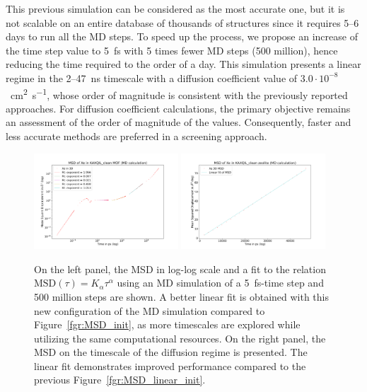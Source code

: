 \documentclass[main]{subfiles}
\begin{document}
This previous simulation can be considered as the most accurate one, but it is not scalable on an entire database of thousands of structures since it requires 5--6 days to run all the MD steps. To speed up the process, we propose an increase of the time step value to 5~\si{\fs} with 5 times fewer MD steps (500 million), hence reducing the time required to the order of a day. This simulation presents a linear regime in the {2}--{47}~\si{\ns} timescale with a diffusion coefficient value of $3.0\cdot10^{-8}$~\si{\square\cm\per\s}, whose order of magnitude is consistent with the previously reported approaches. For diffusion coefficient calculations, the primary objective remains an assessment of the order of magnitude of the values. Consequently, faster and less accurate methods are preferred in a screening approach.

\begin{figure}[ht]
  \centering
  \includegraphics[width=0.48\textwidth]{figures/5-diffusion/MSD_Xe_KAXQIL_clean_5fs.pdf}
  \includegraphics[width=0.48\textwidth]{figures/5-diffusion/MSD_Xe_coeff_KAXQIL_clean_5fs.png}
\caption{ On the left panel, the MSD in log-log scale and a fit to the relation $\text{MSD}(\tau) = K_\alpha\tau^\alpha$ using an MD simulation of a \SI{5}{\fs}-time step and 500 million steps are shown. A better linear fit is obtained with this new configuration of the MD simulation compared to Figure~\ref{fgr:MSD_init}, as more timescales are explored while utilizing the same computational resources. On the right panel, the MSD on the timescale of the diffusion regime is presented. The linear fit demonstrates improved performance compared to the previous Figure~\ref{fgr:MSD_linear_init}.}\label{fgr:MSD_5fs}
\end{figure}
\end{document}
